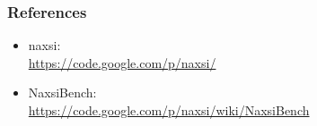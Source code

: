 \begin{frame}[noframenumbering]
  \frametitle<presentation>{References}
  \begin{itemize}
   \item naxsi: \\ \url{https://code.google.com/p/naxsi/}
   \item NaxsiBench: \\ \url{https://code.google.com/p/naxsi/wiki/NaxsiBench}
  \end{itemize}
\end{frame}
